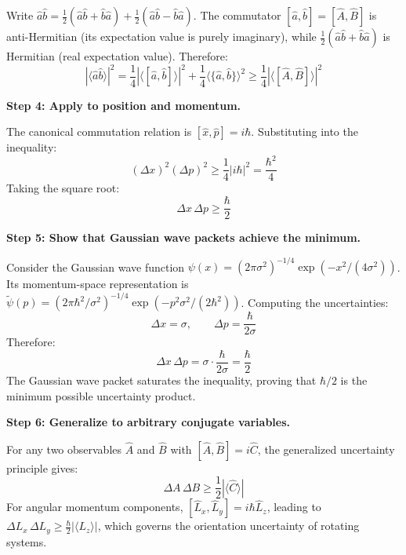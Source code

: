 \documentclass[11pt,openright]{book}
\begin{document}
Write $\hat{a}\hat{b} = \frac{1}{2}(\hat{a}\hat{b} + \hat{b}\hat{a}) + \frac{1}{2}(\hat{a}\hat{b} - \hat{b}\hat{a})$. The commutator $[\hat{a},\hat{b}] = [\hat{A},\hat{B}]$ is anti-Hermitian (its expectation value is purely imaginary), while $\frac{1}{2}(\hat{a}\hat{b} + \hat{b}\hat{a})$ is Hermitian (real expectation value). Therefore:
\begin{equation}
|\langle\hat{a}\hat{b}\rangle|^2 = \frac{1}{4}|\langle[\hat{a},\hat{b}]\rangle|^2 + \frac{1}{4}\langle\{\hat{a},\hat{b}\}\rangle^2 \geq \frac{1}{4}|\langle[\hat{A},\hat{B}]\rangle|^2
\end{equation}

\textbf{Step 4: Apply to position and momentum.}

The canonical commutation relation is $[\hat{x},\hat{p}] = i\hbar$. Substituting into the inequality:
\begin{equation}
(\Delta x)^2(\Delta p)^2 \geq \frac{1}{4}|i\hbar|^2 = \frac{\hbar^2}{4}
\end{equation}
Taking the square root:
\begin{equation}
\Delta x\,\Delta p \geq \frac{\hbar}{2}
\end{equation}

\textbf{Step 5: Show that Gaussian wave packets achieve the minimum.}

Consider the Gaussian wave function $\psi(x) = (2\pi\sigma^2)^{-1/4}\exp(-x^2/(4\sigma^2))$. Its momentum-space representation is $\tilde{\psi}(p) = (2\pi\hbar^2/\sigma^2)^{-1/4}\exp(-p^2\sigma^2/(2\hbar^2))$. Computing the uncertainties:
\begin{equation}
\Delta x = \sigma, \qquad \Delta p = \frac{\hbar}{2\sigma}
\end{equation}
Therefore:
\begin{equation}
\Delta x\,\Delta p = \sigma \cdot \frac{\hbar}{2\sigma} = \frac{\hbar}{2}
\end{equation}
The Gaussian wave packet saturates the inequality, proving that $\hbar/2$ is the minimum possible uncertainty product.

\textbf{Step 6: Generalize to arbitrary conjugate variables.}

For any two observables $\hat{A}$ and $\hat{B}$ with $[\hat{A},\hat{B}] = i\hat{C}$, the generalized uncertainty principle gives:
\begin{equation}
\Delta A\,\Delta B \geq \frac{1}{2}|\langle\hat{C}\rangle|
\end{equation}
For angular momentum components, $[\hat{L}_x,\hat{L}_y] = i\hbar\hat{L}_z$, leading to $\Delta L_x\,\Delta L_y \geq \frac{\hbar}{2}|\langle L_z\rangle|$, which governs the orientation uncertainty of rotating systems.
\end{document}
